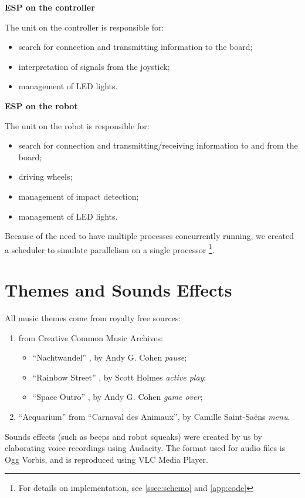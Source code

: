 \documentclass[a4paper,twoside]{book}
\begin{document}
\begin{appendices}
\textbf{ESP on the controller} 

\beforelist The unit on the controller is responsible for:
\begin{itemize}
\item search for connection and transmitting information to the board;
\item interpretation of signals from the joystick;
\item management of LED lights.
\end{itemize}
\afterlist*

\textbf{ESP on the robot} 

\beforelist The unit on the robot is responsible for:
\begin{itemize}
\item search for connection and transmitting/receiving information to and from the board;
\item driving wheels;
\item management of impact detection;
\item management of LED lights.
\end{itemize}
\afterlist*
Because of the need to have multiple processes concurrently running, we created a scheduler to simulate parallelism on a single processor%
\footnote {For details on implementation, see \autoref{ssec:schemo} and \autoref{app:code}}.

\section{Themes and Sounds Effects}
\label{app:noise}

\beforelist All music themes come from royalty free sources:
\begin{enumerate}
\item from Creative Common Music Archives:
  \begin{itemize}
    \item\textquotedblleft{}Nachtwandel\textquotedblright{} , by Andy G. Cohen \textemdash{}  \textit{pause};
    \item\textquotedblleft{}Rainbow Street\textquotedblright{} , by Scott Holmes \textemdash{} \textit{active play};
    \item\textquotedblleft{}Space Outro\textquotedblright{} , by Andy G. Cohen \textemdash{} \textit{game over};
  \end{itemize}
\item \textquotedblleft{}Acquarium\textquotedblright{} from \textquotedblleft{}Carnaval des Animaux\textquotedblright{}, by Camille Saint-Sa\"ens  \textemdash{} \textit{menu}.
\end{enumerate}
\afterlist*
Sounds effects (such as beeps and robot squeaks) were created by us by elaborating voice recordings using Audacity. 
The format used for audio files is Ogg Vorbis, and is reproduced using VLC Media Player.


\end{appendices}
\end{document}
